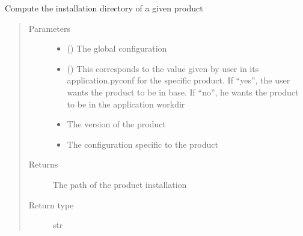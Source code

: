 \documentclass[a4paper,10pt,english]{sphinxmanual}
\begin{document}
\begin{fulllineitems}
\label{\detokenize{commands/apidoc/src:src.product.get_install_dir}}
Compute the installation directory of a given product
\begin{quote}\begin{description}
\item[{Parameters}] \leavevmode\begin{itemize}
\item {} 
 () \textendash{} The global configuration

\item {} 
 () \textendash{} This corresponds to the value given by user in its 
application.pyconf for the specific product. If “yes”, the
user wants the product to be in base. If “no”, he wants the
product to be in the application workdir

\item {} 
 \textendash{} The version of the product

\item {} 
 \textendash{} The configuration specific to 
the product

\end{itemize}

\item[{Returns}] \leavevmode
The path of the product installation

\item[{Return type}] \leavevmode
str

\end{description}\end{quote}

\end{fulllineitems}

\end{document}
